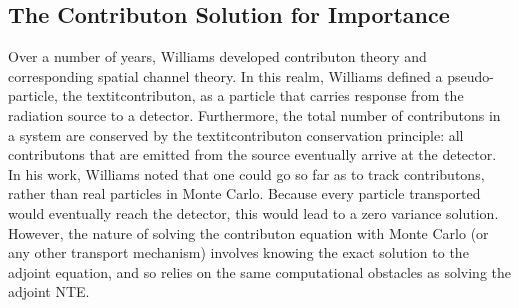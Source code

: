 \subsection{The Contributon Solution for Importance}
\label{sec:ContributonImportance}

Over a number of years, Williams
\cite{williams_generalized_1991,williams_contributorn_1992,williams_contributon_study}
developed contributon theory and corresponding spatial channel theory. In this
realm, Williams defined a pseudo-particle, the textit{contributon}, as a particle
that carries response from the radiation source to a detector. Furthermore, the
total number of contributons in a system are conserved by the textit{contributon
conservation principle}: all contributons that are emitted from the source
eventually arrive at the detector.  In his work, Williams noted that one could
go so far as to track contributons, rather than real particles in Monte Carlo.
Because every particle transported would eventually reach the detector, this
would lead to a zero variance solution. However, the nature of solving the
contributon equation with Monte Carlo (or any other transport mechanism)
involves knowing the exact solution to the adjoint equation, and so relies on
the same computational obstacles as solving the adjoint NTE.

